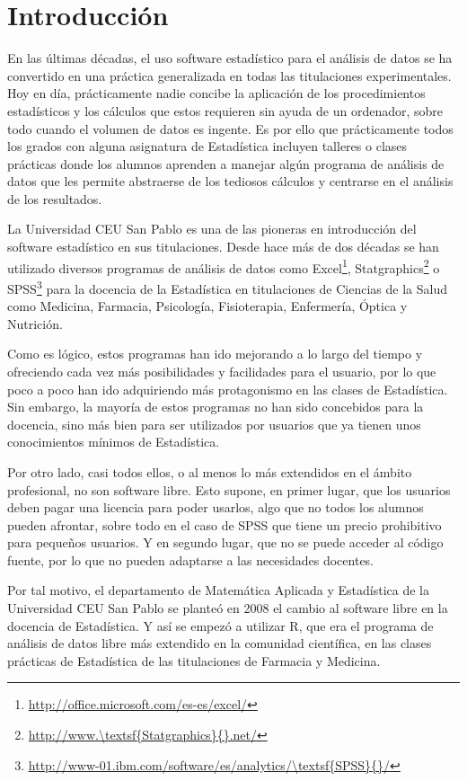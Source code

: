 \documentclass[a4paper,10pt,twoside]{article}
\newcommand{\spss}{\textsf{SPSS}}
\newcommand{\statgraphics}{\textsf{Statgraphics}}
\begin{document}
\section{Introducción}
\label{s:introduccion}
En las últimas décadas, el uso software estadístico para el análisis de datos se ha convertido en una práctica
generalizada en todas las titulaciones experimentales.
Hoy en día, prácticamente nadie concibe la aplicación de los procedimientos estadísticos y los cálculos que estos
requieren sin ayuda de un ordenador, sobre todo cuando el volumen de datos es ingente.
Es por ello que prácticamente todos los grados con alguna asignatura de Estadística incluyen talleres o clases prácticas
donde los alumnos aprenden a manejar algún programa de análisis de datos que les permite abstraerse de los tediosos
cálculos y centrarse en el análisis de los resultados.

La Universidad CEU San Pablo es una de las pioneras en introducción del software estadístico en sus titulaciones. 
Desde hace más de dos décadas se han utilizado diversos programas de análisis de datos como
Excel\footnote{\url{http://office.microsoft.com/es-es/excel/}}, \statgraphics{}\footnote{\url{http://www.\statgraphics{}.net/}} o
\spss{}\footnote{\url{http://www-01.ibm.com/software/es/analytics/\spss{}/}} para la docencia de la Estadística en titulaciones de Ciencias de la
Salud como Medicina, Farmacia, Psicología, Fisioterapia, Enfermería, Óptica y Nutrición.

Como es lógico, estos programas han ido mejorando a lo largo del tiempo y ofreciendo cada vez más posibilidades y
facilidades para el usuario, por lo que poco a poco han ido adquiriendo más protagonismo en las clases de Estadística.
Sin embargo, la mayoría de estos programas no han sido concebidos para la docencia, sino más bien para ser utilizados
por usuarios que ya tienen unos conocimientos mínimos de Estadística.

Por otro lado, casi todos ellos, o al menos lo más extendidos en el ámbito profesional, no son software libre.
Esto supone, en primer lugar, que los usuarios deben pagar una licencia para poder usarlos, algo que no todos los
alumnos pueden afrontar, sobre todo en el caso de \spss{} que tiene un precio prohibitivo para pequeños usuarios.
Y en segundo lugar, que no se puede acceder al código fuente, por lo que no pueden adaptarse a las necesidades docentes.

Por tal motivo, el departamento de Matemática Aplicada y Estadística de la Universidad CEU San Pablo se
planteó en 2008 el cambio al software libre en la docencia de Estadística.
Y así se empezó a utilizar R, que era el programa de análisis de datos libre más extendido en la comunidad
científica, en las clases prácticas de Estadística de las titulaciones de Farmacia y Medicina.
\end{document}
